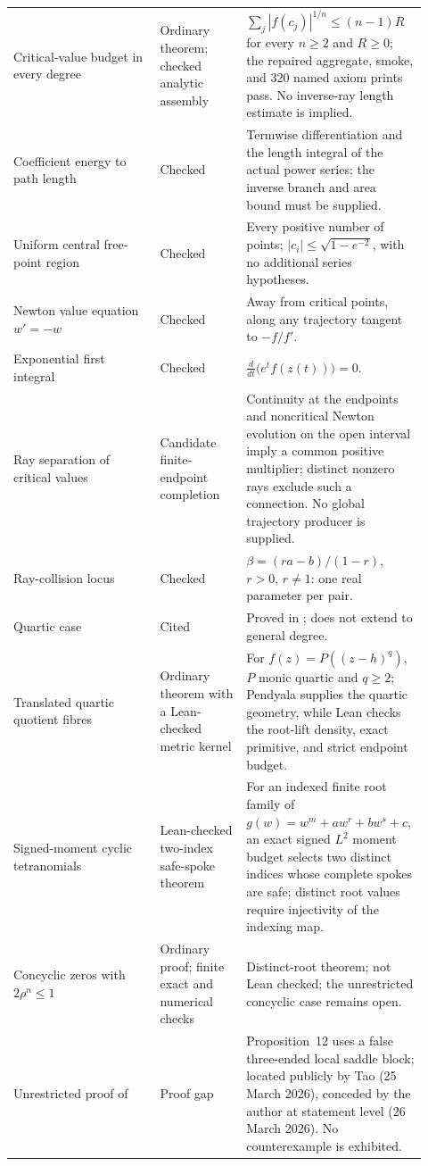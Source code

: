 \documentclass[11pt]{article}
\begin{document}
\begin{longtable}{@{}
  >{\raggedright\arraybackslash}p{0.34\linewidth}
  >{\raggedright\arraybackslash}p{0.20\linewidth}
  >{\raggedright\arraybackslash}p{0.38\linewidth}@{}}
Critical-value budget in every degree & Ordinary theorem; checked analytic assembly & $\sum_j|f(c_j)|^{1/n}\le(n-1)R$ for every $n\ge2$ and $R\ge0$; the repaired aggregate, smoke, and 320 named axiom prints pass. No inverse-ray length estimate is implied. \\
Coefficient energy to path length & Checked & Termwise differentiation and the length integral of the actual power series; the inverse branch and area bound must be supplied. \\
Uniform central free-point region & Checked & Every positive number of points; $|c_i|\le\sqrt{1-e^{-2}}$, with no additional series hypotheses. \\
Newton value equation $w'=-w$ & Checked & Away from critical points, along any trajectory tangent to $-f/f'$. \\
Exponential first integral & Checked & $\tfrac{d}{dt}\bigl(e^{t}f(z(t))\bigr)=0$. \\
Ray separation of critical values & Candidate finite-endpoint completion & Continuity at the endpoints and noncritical Newton evolution on the open interval imply a common positive multiplier; distinct nonzero rays exclude such a connection. No global trajectory producer is supplied. \\
Ray-collision locus & Checked & $\beta=(ra-b)/(1-r)$, $r>0$, $r\ne1$: one real parameter per pair. \\
Quartic case & Cited & Proved in \cite[Thm.~1, p.~1]{june2026}; does not extend to general degree. \\
Translated quartic quotient fibres & Ordinary theorem with a Lean-checked metric kernel & For $f(z)=P((z-h)^q)$, $P$ monic quartic and $q\ge2$; Pendyala supplies the quartic geometry, while Lean checks the root-lift density, exact primitive, and strict endpoint budget. \\
Signed-moment cyclic tetranomials & Lean-checked two-index safe-spoke theorem & For an indexed finite root family of $g(w)=w^m+aw^r+bw^s+c$, an exact signed $L^2$ moment budget selects two distinct indices whose complete spokes are safe; distinct root values require injectivity of the indexing map. \\
Concyclic zeros with $2\rho^n\le1$ & Ordinary proof; finite exact and numerical checks & Distinct-root theorem; not Lean checked; the unrestricted concyclic case remains open. \\
Unrestricted proof of \cite[Theorem~1, p.~1]{march2026} & Proof gap & Proposition~12 uses a false three-ended local saddle block; located publicly by Tao (25 March 2026), conceded by the author at statement level (26 March 2026).  No counterexample is exhibited. \\

\end{longtable}
\end{document}
